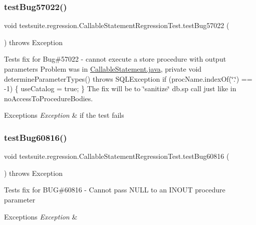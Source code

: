\subsubsection{\texorpdfstring{test\+Bug57022()}{testBug57022()}}
{\footnotesize\ttfamily void testsuite.\+regression.\+Callable\+Statement\+Regression\+Test.\+test\+Bug57022 (\begin{DoxyParamCaption}{ }\end{DoxyParamCaption}) throws Exception}

Tests fix for Bug\#57022 -\/ cannot execute a store procedure with output parameters Problem was in \mbox{\hyperlink{_callable_statement_8java}{Callable\+Statement.\+java}}, private void determine\+Parameter\+Types() throws S\+Q\+L\+Exception if (proc\+Name.\+index\+Of(\char`\"{}.\char`\"{}) == -\/1) \{ use\+Catalog = true; \} The fix will be to \char`\"{}sanitize\char`\"{} db.\+sp call just like in no\+Access\+To\+Procedure\+Bodies.


\begin{DoxyExceptions}{Exceptions}
{\em Exception} & if the test fails \\
\hline
\end{DoxyExceptions}
\mbox{\label{classtestsuite_1_1regression_1_1_callable_statement_regression_test_adf4d392882f055ca081e7af6441af0e5}} 
\subsubsection{\texorpdfstring{test\+Bug60816()}{testBug60816()}}
{\footnotesize\ttfamily void testsuite.\+regression.\+Callable\+Statement\+Regression\+Test.\+test\+Bug60816 (\begin{DoxyParamCaption}{ }\end{DoxyParamCaption}) throws Exception}

Tests fix for B\+UG\#60816 -\/ Cannot pass N\+U\+LL to an I\+N\+O\+UT procedure parameter


\begin{DoxyExceptions}{Exceptions}
{\em Exception} & \\
\hline
\end{DoxyExceptions}
\mbox{\label{classtestsuite_1_1regression_1_1_callable_statement_regression_test_a7bf5345327e03c1c948299a62ca552c7}} 
